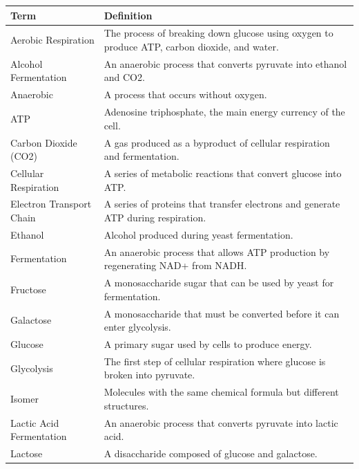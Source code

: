 \documentclass[
  letterpaper,
  DIV=11,
  numbers=noendperiod]{scrreprt}
\newcounter{none} %
\begin{document}
{\def\LTcaptype{none} %
\begin{longtable}[]{@{}
  >{\raggedright\arraybackslash}p{}
  >{\raggedright\arraybackslash}p{}@{}}
\toprule\noalign{}
\begin{minipage}[b]{\linewidth}\raggedright
\textbf{Term}
\end{minipage} & \begin{minipage}[b]{\linewidth}\raggedright
\textbf{Definition}
\end{minipage} \\
\midrule\noalign{}
\endhead
\bottomrule\noalign{}
\endlastfoot
Aerobic Respiration & The process of breaking down glucose using oxygen
to produce ATP, carbon dioxide, and water. \\
Alcohol Fermentation & An anaerobic process that converts pyruvate into
ethanol and CO2. \\
Anaerobic & A process that occurs without oxygen. \\
ATP & Adenosine triphosphate, the main energy currency of the cell. \\
Carbon Dioxide (CO2) & A gas produced as a byproduct of cellular
respiration and fermentation. \\
Cellular Respiration & A series of metabolic reactions that convert
glucose into ATP. \\
Electron Transport Chain & A series of proteins that transfer electrons
and generate ATP during respiration. \\
Ethanol & Alcohol produced during yeast fermentation. \\
Fermentation & An anaerobic process that allows ATP production by
regenerating NAD+ from NADH. \\
Fructose & A monosaccharide sugar that can be used by yeast for
fermentation. \\
Galactose & A monosaccharide that must be converted before it can enter
glycolysis. \\
Glucose & A primary sugar used by cells to produce energy. \\
Glycolysis & The first step of cellular respiration where glucose is
broken into pyruvate. \\
Isomer & Molecules with the same chemical formula but different
structures. \\
Lactic Acid Fermentation & An anaerobic process that converts pyruvate
into lactic acid. \\
Lactose & A disaccharide composed of glucose and galactose. \\

\end{longtable}}
\end{document}
